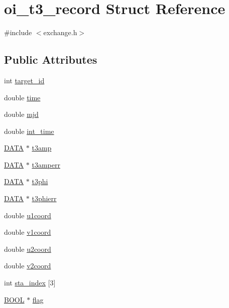 \hypertarget{structoi__t3__record}{
\section{oi\_\-t3\_\-record Struct Reference}
\label{structoi__t3__record}
}


{\ttfamily \#include $<$exchange.h$>$}

\subsection*{Public Attributes}
\begin{DoxyCompactItemize}
\item 
int \hyperlink{structoi__t3__record_a1fc9b4818dd722a5584ed08cbfc479af}{target\_\-id}
\item 
double \hyperlink{structoi__t3__record_ab06b79d9fb8fb5dccf1cd1df16096834}{time}
\item 
double \hyperlink{structoi__t3__record_a5ff8517d65d53869a62eab55fed270c5}{mjd}
\item 
double \hyperlink{structoi__t3__record_a37ec157938438afcbd02a7acfad075a7}{int\_\-time}
\item 
\hyperlink{group__oitable_gaad99e8bad1a589e9f406f33403d42ca7}{DATA} $\ast$ \hyperlink{structoi__t3__record_adfcdebe6934de0a96674fcfae0c3e6a4}{t3amp}
\item 
\hyperlink{group__oitable_gaad99e8bad1a589e9f406f33403d42ca7}{DATA} $\ast$ \hyperlink{structoi__t3__record_a16deb89e2d6aca09e9170d0df9ab0964}{t3amperr}
\item 
\hyperlink{group__oitable_gaad99e8bad1a589e9f406f33403d42ca7}{DATA} $\ast$ \hyperlink{structoi__t3__record_a0038d03c36f8fe8dd9d583eb3885157b}{t3phi}
\item 
\hyperlink{group__oitable_gaad99e8bad1a589e9f406f33403d42ca7}{DATA} $\ast$ \hyperlink{structoi__t3__record_ab71f2c95698f1a5d70b184c5e389cf24}{t3phierr}
\item 
double \hyperlink{structoi__t3__record_aa3c3264bedbd243687b4361bb6975c3a}{u1coord}
\item 
double \hyperlink{structoi__t3__record_a2483d954ffd744426f0c34604c5a266c}{v1coord}
\item 
double \hyperlink{structoi__t3__record_a0b231e7bf88856eb0957ff276fb11b2c}{u2coord}
\item 
double \hyperlink{structoi__t3__record_ab8343c5dce943c1919169d3ef9c4ac2b}{v2coord}
\item 
int \hyperlink{structoi__t3__record_adbc855db3a317e574e9c0ad3af4c5f56}{sta\_\-index} \mbox{[}3\mbox{]}
\item 
\hyperlink{group__oitable_gaf492d2bddcb2befacb3aa03dcdf9aafd}{BOOL} $\ast$ \hyperlink{structoi__t3__record_a0c8d9d803d3c33282b4cd3724704d45f}{flag}
\end{DoxyCompactItemize}


